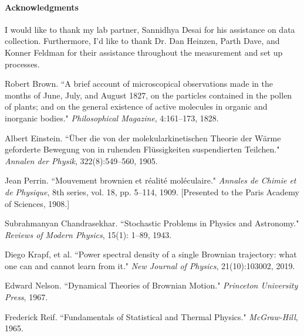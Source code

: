 \documentclass[10pt,letterpaper,onecolumn]{article}
\begin{document}
\paragraph*{Acknowledgments}
I would like to thank my lab partner, Sannidhya Desai for his assistance on data
collection. Furthermore, I'd like to thank Dr. Dan Heinzen,
Parth Dave, and Konner Feldman for their assistance throughout the measurement and 
set up processes.





\begin{thebibliography}{9}

    Robert Brown.
    \newblock ``A brief account of microscopical observations made in the months of June, July, and August 1827, on the particles contained in the pollen of plants; and on the general existence of active molecules in organic and inorganic bodies."
    \newblock \emph{Philosophical Magazine}, 4:161–173, 1828.
    
    Albert Einstein.
    \newblock ``\"Uber die von der molekularkinetischen Theorie der W\"arme geforderte Bewegung von in ruhenden Fl\"ussigkeiten suspendierten Teilchen."
    \newblock \emph{Annalen der Physik}, 322(8):549–560, 1905.
    
    Jean Perrin.
    \newblock ``Mouvement brownien et réalité moléculaire."
    \newblock \emph{Annales de Chimie et de Physique}, 8th series, vol. 18, pp. 5–114, 1909. [Presented to the Paris Academy of Sciences, 1908.]
    
    Subrahmanyan Chandrasekhar.
    \newblock ``Stochastic Problems in Physics and Astronomy."
    \newblock \emph{Reviews of Modern Physics}, 15(1): 1–89, 1943.
    
    Diego Krapf, et al.
    \newblock ``Power spectral density of a single Brownian trajectory: what one can and cannot learn from it."
    \newblock \emph{New Journal of Physics}, 21(10):103002, 2019.
    
    Edward Nelson.
    \newblock ``Dynamical Theories of Brownian Motion."
    \newblock \emph{Princeton University Press}, 1967.
    
    Frederick Reif.
    \newblock ``Fundamentals of Statistical and Thermal Physics."
    \newblock \emph{McGraw-Hill}, 1965.
    
    \end{thebibliography}
    
\end{document}
